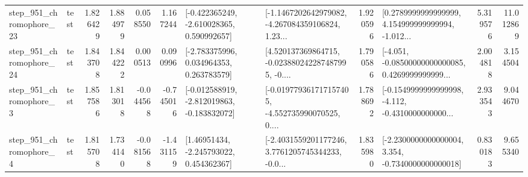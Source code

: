 \begin{tabular}{llrrrrllrlrr}
  step\_951\_chromophore\_23 &      test &      1.826429 &    1.884979 &      0.058550 &  1.167244 &   [-0.422365249, -2.610028365, 0.590992657] &  [-1.1467202642979082, -4.267084359106824, 1.23... &       1.920596 &  [0.2789999999999999, 4.154999999999994, -1.012... &            5.319576 &         11.012869 \\
  step\_951\_chromophore\_24 &      test &      1.843708 &    1.844222 &      0.000513 &  0.090996 &    [-2.783375996, 0.034964353, 0.263783579] &  [4.520137369864715, -0.023880242287487995, -0.... &       1.790586 &  [-4.051, -0.08500000000000085, 0.4269999999999... &            2.004818 &          3.154504 \\
   step\_951\_chromophore\_3 &      test &      1.857586 &    1.813018 &     -0.044568 & -0.745016 &  [-0.012588919, -2.812019863, -0.183832072] &  [-0.019779361717157405, -4.552735990070525, 0.... &       1.788692 &  [-0.1549999999999998, -4.112, -0.4310000000000... &            2.933543 &          9.044670 \\
   step\_951\_chromophore\_4 &      test &      1.815708 &    1.734140 &     -0.081568 & -1.431159 &     [1.46951434, -2.245793022, 0.454362367] &  [-2.4031559201177246, 3.7761205745344233, -0.0... &       1.835980 &  [-2.2300000000000004, 3.354, -0.7340000000000018] &            0.830183 &          9.655340 \\
\bottomrule
\end{tabular}

